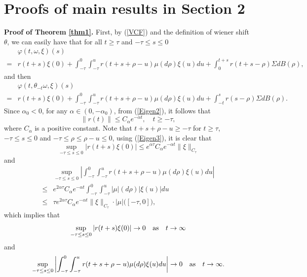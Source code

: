 \documentclass[preprint,12pt]{elsarticle}
\begin{document}
\section{Proofs of main results in Section 2}
\noindent
{\bf Proof of Theorem \ref{thm1}.}
First, by (\ref{VCF}) and the definition of wiener shift $\theta$, we can easily have that for all $t\geq\tau$ and $-\tau\leq s\leq0$
\begin{align}\label{eq1}
&\varphi(t,\omega,\xi)(s)\nonumber\\
=&r(t+s)\xi(0)+\int_{-\tau}^0\int_{-\tau}^{u}r(t+s+\rho-u)\mu(d\rho)\xi(u)du+\int_0^{t+s}r(t+s-\rho)\Sigma dB(\rho),
\end{align}
and then
\begin{align}\label{eq2}
&\varphi(t,\theta_{-t}\omega,\xi)(s)\nonumber\\
=&r(t+s)\xi(0)+\int_{-\tau}^0\int_{-\tau}^{u}r(t+s+\rho-u)\mu(d\rho)\xi(u)du+\int_{-t}^sr(s-\rho)\Sigma dB(\rho).
\end{align}
Since $\alpha_0<0$, for any $\alpha\in(0,-\alpha_0)$, from (\ref{Eigen2}), it follows that
\begin{equation}\label{Eigen3}
\|r(t)\|\leq C_\alpha e^{-\alpha t},\quad t\geq-\tau,
\end{equation}
where $C_\alpha$ is a positive constant. Note that $t+s+\rho-u\geq-\tau$ for $t\geq\tau$, $-\tau\leq s\leq0$ and $-\tau\leq\rho\leq\rho-u\leq0$, using (\ref{Eigen3}), it is clear that
\begin{equation}\label{eq3}
\sup_{-\tau\leq s\leq0}|r(t+s)\xi(0)|\leq e^{\alpha\tau}C_\alpha e^{-\alpha t}\|\xi\|_{C_\tau}
\end{equation}
and
\begin{align}\label{eq4}
&\sup_{-\tau\leq s\leq0}\left|\int_{-\tau}^0\int_{-\tau}^{u}r(t+s+\rho-u)\mu(d\rho)\xi(u)du\right|\nonumber\\
\leq&e^{2\alpha\tau}C_\alpha e^{-\alpha t}\int_{-\tau}^0\int_{-\tau}^{u}|\mu|(d\rho)|\xi(u)|du\nonumber\\
\leq&\tau e^{2\alpha\tau}C_\alpha e^{-\alpha t}\|\xi\|_{C_\tau}\cdot|\mu|\bigl([-\tau,0]\bigr),
\end{align}
which implies that
\begin{equation}\label{eq4-1}
\sup_{-\tau\leq s\leq0}|r(t+s)\xi(0)|\rightarrow0\quad {\rm as}\quad t\rightarrow\infty
\end{equation}
and
\begin{equation}\label{eq5}
\sup_{-\tau\leq s\leq0}\left|\int_{-\tau}^0\int_{-\tau}^{u}r(t+s+\rho-u)\mu(d\rho)\xi(u)du\right|\rightarrow0\quad {\rm as}\quad t\rightarrow\infty.
\end{equation}
\end{document}
